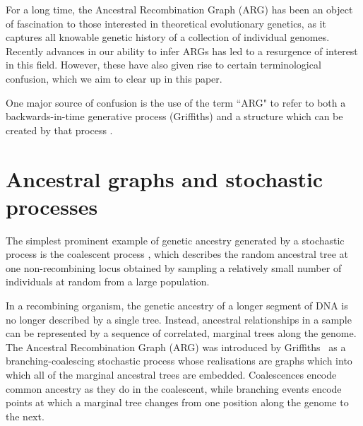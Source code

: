 \documentclass{article}
\begin{document}
For a long time, the Ancestral Recombination Graph (ARG) has been an object of
fascination to those interested in theoretical evolutionary genetics, as it
captures all knowable genetic history of a collection of individual genomes.
Recently advances in our ability to infer ARGs has led to a resurgence of
interest in this field. However, these have also given rise to certain
terminological confusion, which we aim to clear up in this paper.

One major source of confusion is the use of the term ``ARG" to refer to both a
backwards-in-time generative process (Griffiths) and a structure which can be
created by that process
\citep[e.g.][]{minichiello2006mapping,mathieson2020ancestry}.

\section*{Ancestral graphs and stochastic processes}


The simplest prominent example of genetic ancestry generated by a stochastic process
is the coalescent process \citep{kingman1982coalescent,kingman1982genealogy,
hudson1983testing, tajima1983evolutionary}, which describes the random
ancestral tree at one non-recombining locus obtained by sampling a relatively
small number of individuals at random from a large population.

In a recombining organism, the genetic ancestry of a longer segment of DNA is 
no longer described by a single tree. Instead, ancestral relationships in a
sample can be represented by a sequence of correlated, marginal trees along the
genome. The Ancestral Recombination Graph (ARG) was introduced by
Griffiths~\citep{griffiths1991two,griffiths1997ancestral} as a branching-coalescing 
stochastic process whose realisations are graphs which into which all of the
marginal ancestral trees are embedded. Coalescences encode common ancestry
as they do in the coalescent, while branching events encode points at which a
marginal tree changes from one position along the genome to the next.
\end{document}
